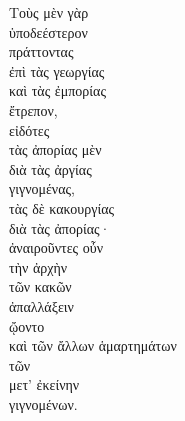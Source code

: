 {\large
\begin{greek}
\noindent Τοὺς μὲν γὰρ \\
\tabto{2em} ὑποδεέστερον \\
πράττοντας \\
\tabto{2em} ἐπὶ τὰς γεωργίας \\
\tabto{2em} καὶ τὰς ἐμπορίας \\
ἔτρεπον, \\

εἰδότες \\
τὰς ἀπορίας μὲν \\
\tabto{2em} διὰ τὰς ἀργίας \\
γιγνομένας, \\
τὰς δὲ κακουργίας \\
\tabto{2em} διὰ τὰς ἀπορίας· \\
ἀναιροῦντες οὖν \\
\tabto{2em} τὴν ἀρχὴν \\
\tabto{4em} τῶν κακῶν\\
\tabto{2em} ἀπαλλάξειν \\
ᾤοντο \\
\tabto{2em} καὶ τῶν ἄλλων ἁμαρτημάτων \\
\tabto{2em} τῶν \\
\tabto{4em} μετ' ἐκείνην \\
\tabto{2em} γιγνομένων.\\

\end{greek}
}

